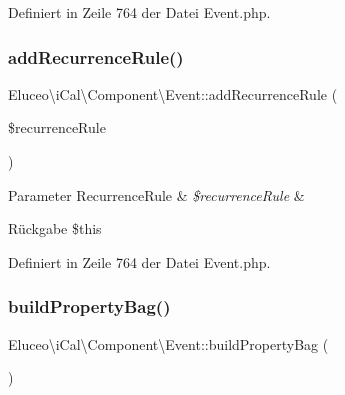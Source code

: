 Definiert in Zeile 764 der Datei Event.\+php.

\mbox{\label{class_eluceo_1_1i_cal_1_1_component_1_1_event_a204c48aab126855e3176ed4a796361be}} 
\subsubsection{\texorpdfstring{add\+Recurrence\+Rule()}{addRecurrenceRule()}\hspace{0.1cm}{\footnotesize\ttfamily [3/3]}}
{\footnotesize\ttfamily Eluceo\textbackslash{}i\+Cal\textbackslash{}\+Component\textbackslash{}\+Event\+::add\+Recurrence\+Rule (\begin{DoxyParamCaption}\item[{\mbox{\hyperlink{class_eluceo_1_1i_cal_1_1_property_1_1_event_1_1_recurrence_rule}{Recurrence\+Rule}}}]{\$recurrence\+Rule }\end{DoxyParamCaption})}


\begin{DoxyParams}[1]{Parameter}
Recurrence\+Rule & {\em \$recurrence\+Rule} & \\
\hline
\end{DoxyParams}
\begin{DoxyReturn}{Rückgabe}
\$this 
\end{DoxyReturn}


Definiert in Zeile 764 der Datei Event.\+php.

\mbox{\label{class_eluceo_1_1i_cal_1_1_component_1_1_event_af5012821fe765f4901f9e18cdc0c33c5}} 
\subsubsection{\texorpdfstring{build\+Property\+Bag()}{buildPropertyBag()}\hspace{0.1cm}{\footnotesize\ttfamily [1/3]}}
{\footnotesize\ttfamily Eluceo\textbackslash{}i\+Cal\textbackslash{}\+Component\textbackslash{}\+Event\+::build\+Property\+Bag (\begin{DoxyParamCaption}{ }\end{DoxyParamCaption})}

